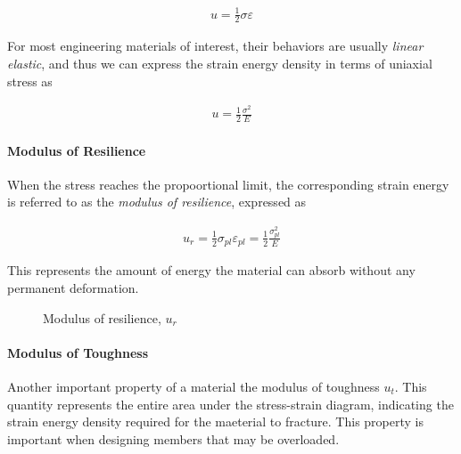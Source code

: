 \documentclass[
fontsize=10pt,
a4paper,
twosides=false,
open=any,
svgnames,
]{kaobook} %
\begin{document}
\begin{align}
  \label{eq: strain energy density}
  u = \frac{1}{2}\sigma\varepsilon
\end{align}

For most engineering materials of interest, their behaviors are usually \emph{linear elastic}, and thus we can express the strain energy density in terms of uniaxial stress as

\begin{align}
  \label{eq: strain energy density - linear elastic}
  u = \frac{1}{2}\frac{\sigma^2}{E}
\end{align}

\paragraph{Modulus of Resilience} When the stress reaches the propoortional limit, the corresponding strain energy is referred to as the \emph{modulus of resilience}, expressed as

\begin{align}
  \label{eq: modulus of resilience}
  u_r = \frac{1}{2}\sigma_{pl}\varepsilon_{pl} = \frac{1}{2}\frac{\sigma_{pl}^2}{E}
\end{align}

This represents the amount of energy the material can absorb without any permanent deformation.

\begin{figure}[H]
  \centering
  \caption{Modulus of resilience, $u_r$}
  \label{fig: modulus of toughness}
\end{figure}

\paragraph{Modulus of Toughness} Another important property of a material the modulus of toughness $u_t$. This quantity represents the entire area under the stress-strain diagram, indicating the strain energy density required for the maeterial to fracture. This property is important when designing members that may be overloaded.
\end{document}
